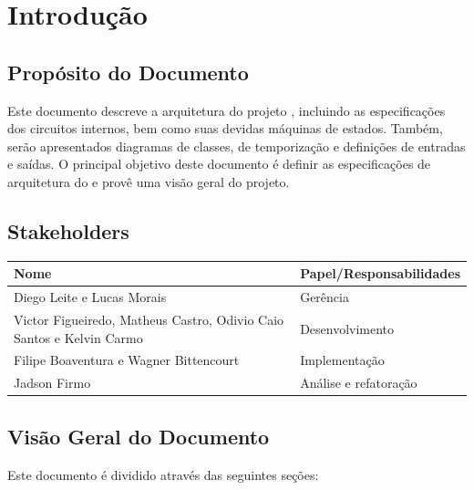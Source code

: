 \documentclass{report}
\begin{document}
\tableofcontents

\chapter{Introdução}
  
  \section{Propósito do Documento}
  Este documento descreve a arquitetura do projeto \ipPROCESSProject, incluindo as especificações dos circuitos internos, bem como suas devidas máquinas de estados. Também, serão apresentados diagramas de classes, de temporização e definições de entradas e saídas. O principal objetivo deste documento é definir as especificações de arquitetura do \ipPROCESSProject e provê uma visão geral do projeto.
  
  \section{Stakeholders}
    \FloatBarrier
    \begin{table}[H] 
      \begin{center}
        \begin{tabular}[pos]{|m{6cm} | m{8cm}|} 
          \hline 
          \cellcolor[gray]{0.9}\textbf{Nome} & \cellcolor[gray]{0.9}\textbf{Papel/Responsabilidades} \\ \hline
           Diego Leite e Lucas Morais & Gerência  \\ \hline
           Victor Figueiredo, Matheus Castro, Odivio Caio Santos e Kelvin Carmo & Desenvolvimento  \\ \hline
           Filipe Boaventura e Wagner Bittencourt & Implementação  \\ \hline
           Jadson Firmo & Análise e refatoração  \\ \hline
        \end{tabular}
      \end{center}
    \end{table} 

\section{Visão Geral do Documento}

Este documento é dividido através das seguintes seções:\\
\end{document}
